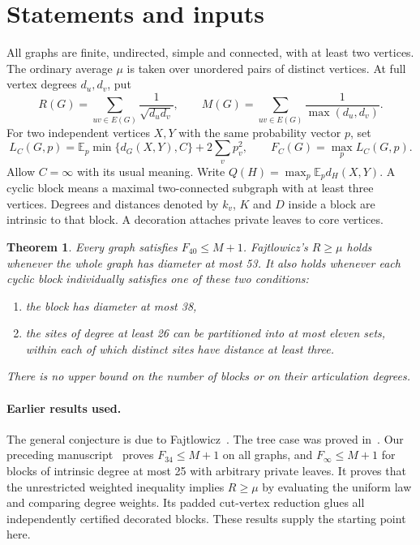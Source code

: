 \documentclass[11pt,a4paper]{article}
\newtheorem{theorem}{Theorem}[section]
\begin{document}
\section{Statements and inputs}
All graphs are finite, undirected, simple and connected, with at least two vertices. The ordinary average $\mu$ is taken over unordered pairs of distinct vertices. At full vertex degrees $d_u,d_v$, put
\[
 R(G)=\sum_{uv\in E(G)}\frac1{\sqrt{d_ud_v}},\qquad
 M(G)=\sum_{uv\in E(G)}\frac1{\max(d_u,d_v)} .
\]
For two independent vertices $X,Y$ with the same probability vector $p$, set
\[
 L_C(G,p)=\mathbb E_p\min\{d_G(X,Y),C\}+2\sum_v p_v^2,
 \qquad F_C(G)=\max_p L_C(G,p).
\]
Allow $C=\infty$ with its usual meaning. Write $Q(H)=\max_p\mathbb E_p d_H(X,Y)$. A cyclic block means a maximal two-connected subgraph with at least three vertices. Degrees and distances denoted by $k_v$, $K$ and $D$ inside a block are intrinsic to that block. A decoration attaches private leaves to core vertices.
\begin{theorem}\label{p14-main}
Every graph satisfies $F_{40}\le M+1$. Fajtlowicz's $R\ge\mu$ holds whenever the whole graph has diameter at most 53. It also holds whenever each cyclic block individually satisfies one of these two conditions:
\begin{enumerate}
\item the block has diameter at most 38,
\item the sites of degree at least 26 can be partitioned into at most eleven sets, within each of which distinct sites have distance at least three.
\end{enumerate}
There is no upper bound on the number of blocks or on their articulation degrees.
\end{theorem}
\paragraph{Earlier results used.}
The general conjecture is due to Fajtlowicz~\cite{p14-fajt}. The tree case was proved in~\cite{p14-tree}. Our preceding manuscript~\cite{p14-prior} proves $F_{34}\le M+1$ on all graphs, and $F_\infty\le M+1$ for blocks of intrinsic degree at most 25 with arbitrary private leaves. It proves that the unrestricted weighted inequality implies $R\ge\mu$ by evaluating the uniform law and comparing degree weights. Its padded cut-vertex reduction glues all independently certified decorated blocks. These results supply the starting point here.
\end{document}
